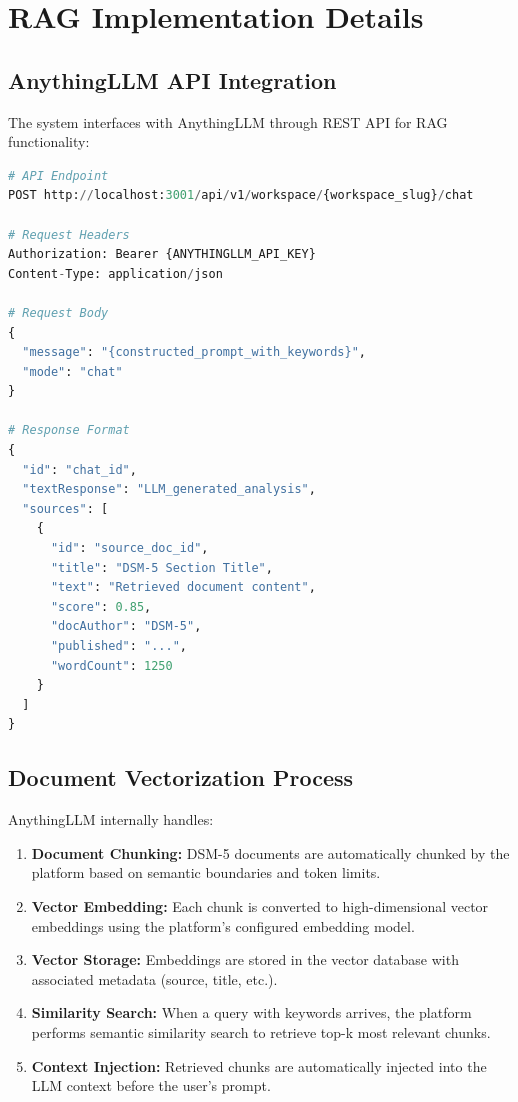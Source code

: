 \documentclass[sigconf,review,anonymous]{acmart}
\begin{document}
\section{RAG Implementation Details}
\label{sec:rag}

\subsection{AnythingLLM API Integration}

The system interfaces with AnythingLLM through REST API for RAG functionality:

\begin{lstlisting}[language=Python,style=promptstyle]
# API Endpoint
POST http://localhost:3001/api/v1/workspace/{workspace_slug}/chat

# Request Headers
Authorization: Bearer {ANYTHINGLLM_API_KEY}
Content-Type: application/json

# Request Body
{
  "message": "{constructed_prompt_with_keywords}",
  "mode": "chat"
}

# Response Format
{
  "id": "chat_id",
  "textResponse": "LLM_generated_analysis",
  "sources": [
    {
      "id": "source_doc_id",
      "title": "DSM-5 Section Title",
      "text": "Retrieved document content",
      "score": 0.85,
      "docAuthor": "DSM-5",
      "published": "...",
      "wordCount": 1250
    }
  ]
}
\end{lstlisting}

\subsection{Document Vectorization Process}

AnythingLLM internally handles:

\begin{enumerate}
\item \textbf{Document Chunking:} DSM-5 documents are automatically chunked by the platform based on semantic boundaries and token limits.

\item \textbf{Vector Embedding:} Each chunk is converted to high-dimensional vector embeddings using the platform's configured embedding model.

\item \textbf{Vector Storage:} Embeddings are stored in the vector database with associated metadata (source, title, etc.).

\item \textbf{Similarity Search:} When a query with keywords arrives, the platform performs semantic similarity search to retrieve top-k most relevant chunks.

\item \textbf{Context Injection:} Retrieved chunks are automatically injected into the LLM context before the user's prompt.
\end{enumerate}
\end{document}
